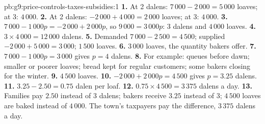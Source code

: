 \begin{solution}{pb:g9:price-controls-taxes-subsidies:1}
\textbf{1.} At 2 dalens: $7\,000 - 2\,000 = 5\,000$ loaves; at 3: $4\,000$.
\textbf{2.} At 2 dalens: $-2\,000 + 4\,000 = 2\,000$ loaves; at 3: $4\,000$.
\textbf{3.} $7\,000 - 1\,000p = -2\,000 + 2\,000p$, so $9\,000 = 3\,000p$: 3 dalens and $4\,000$ loaves.
\textbf{4.} $3 \times 4\,000 = 12\,000$ dalens.
\textbf{5.} Demanded $7\,000 - 2\,500 = 4\,500$; supplied $-2\,000 + 5\,000 = 3\,000$;  $1\,500$
loaves.
\textbf{6.} $3\,000$ loaves, the quantity bakers offer.
\textbf{7.} $7\,000 - 1\,000p = 3\,000$ gives $p = 4$ dalens.
\textbf{8.} For example: queues before dawn; smaller or poorer loaves; bread kept for regular customers; some
bakers closing for the winter.
\textbf{9.} $4\,500$ loaves.
\textbf{10.} $-2\,000 + 2\,000p = 4\,500$ gives $p = 3.25$ dalens.
\textbf{11.} $3.25 - 2.50 = 0.75$ dalen per loaf.
\textbf{12.} $0.75 \times 4\,500 = 3\,375$ dalens a day.
\textbf{13.} Families pay $2.50$ instead of 3 dalens; bakers receive $3.25$ instead of 3; $4\,500$ loaves
are baked instead of $4\,000$. The town's taxpayers pay the difference, $3\,375$ dalens a day.
\end{solution}

